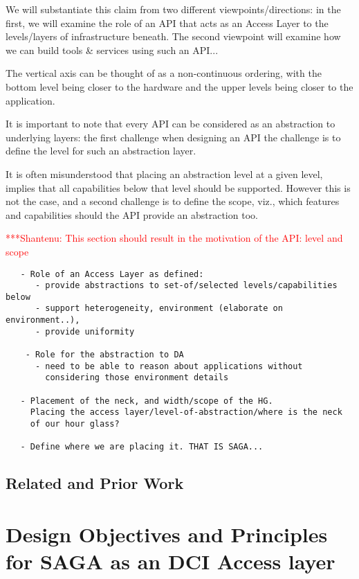 \documentclass[a4paper,12pt]{article}
\newcommand{\jhanote}[1]{  {\textcolor{red}  { ***Shantenu: #1 }}}
\newcommand{\jhanote}[1]{}
\begin{document}
We will substantiate this claim from two different
viewpoints/directions: in the first, we will examine the role of an
API that acts as an Access Layer to the levels/layers of
infrastructure beneath. The second viewpoint will examine how we can
build tools \& services using such an API...

The vertical axis can be thought of as a non-continuous ordering, with
the bottom level being closer to the hardware and the upper levels
being closer to the application.

It is important to note that every API can be considered as an
abstraction to underlying layers: the first challenge when designing
an API the challenge is to define the level for such an abstraction
layer.  

It is often misunderstood that placing an abstraction level at a given
level, implies that all capabilities below that level should be
supported. However this is not the case, and a second challenge is to
define the scope, viz., which features and capabilities should the API
provide an abstraction too.

\jhanote{This section should result in the motivation of the API:
  level and scope}


\begin{verbatim}
   - Role of an Access Layer as defined:
      - provide abstractions to set-of/selected levels/capabilities below
      - support heterogeneity, environment (elaborate on environment..), 
      - provide uniformity

    - Role for the abstraction to DA 
      - need to be able to reason about applications without 
        considering those environment details

   - Placement of the neck, and width/scope of the HG.
     Placing the access layer/level-of-abstraction/where is the neck
     of our hour glass?

   - Define where we are placing it. THAT IS SAGA...
\end{verbatim}

\subsection{Related and Prior Work}
% 
\section{Design Objectives and Principles for SAGA as an DCI Access layer}
\label{sec:designobjectives}
\end{document}
